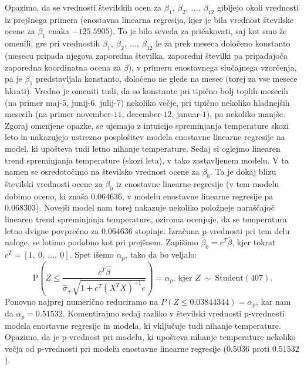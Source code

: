 \documentclass{article}
\begin{document}
Opazimo, da se vrednosti številskih ocen za $\beta_1,~\beta_2,~\dots,~\beta_{12}$ gibljejo okoli vrednosti iz prejšnega primera (enostavna linearna regresija, kjer je bila vrednost številske ocene za $\beta_1$ enaka $-125.5905$). 
To je bilo seveda za pričakovati, saj kot smo že omenili, gre pri vrednostih $\beta_1,~\beta_2,~\dots,~\beta_{12}$ le za prek meseca določeno konstanto (mesecu pripada njegova zaporedna številka, zaporedni številki pa pripadajoča zaporedna koordinatna ocena za $\beta$), v primeru enostavnega slučajnega vzorčenja, pa je $\beta_1$ predstavljala konstanto, določeno ne glede na mesec (torej za vse mesece hkrati). 
Vredno je omeniti tudi, da so konstante pri tipično bolj toplih mesecih (na primer maj-$5$, junij-$6$, julij-$7$) nekoliko večje, pri tipično nekoliko hladnejših mesecih (na primer november-$11$, december-$12$, januar-$1$), pa nekoliko manjše.
Zgoraj omenjene opazke, se ujemajo z intuicijo spreminjanja temperature skozi leto in nakazujejo ustrezno posplošitev modela enostavne linearne regresije na model, ki upošteva tudi letno nihanje temperature. 
\newline
Sedaj si oglejmo linearen trend spreminjanja temperature (skozi leta), v tako zastavljenem modelu. V ta namen se osredotočimo na številsko vrednost ocene za $\beta_0$. Ta je dokaj blizu številski vrednosti ocene za $\beta_0$ iz enostavne linearne regresije (v tem modelu dobimo oceno, ki znaša $0.064636$, v modelu enostavne linearne regresije pa $0.068303$). 
Novejši model nam torej nakazuje nekoliko položneje naraščajoč linearen trend spreminjanja temperature, oziroma ocenjuje, da se temperatura letno dvigne povprečno za $0.064636$ stopinje.
\newline
\newline 
Izračuna p-vrednosti pri tem delu naloge, se lotimo podobno kot pri prejšnem. Zapišimo $\hat{\beta}_0 = c^T\hat{\beta}$, kjer tokrat $c^T = [1,~0,~\dots,~0]$.
Spet išemo $\alpha_p$, tako da bo veljalo:
$$
\text{P}\left(Z \leq \frac{c^T\hat{\beta}}{\hat{\sigma}_{+}\sqrt{1 + c^T(X^TX)^{-1}c}}\right) = \alpha_p,~\text{kjer }Z~\sim~\text{Student}(407). 
$$
Ponovno najprej numerično reduciramo na $P(Z \leq 0.03844344) = \alpha_p$, kar nam da $\alpha_p = 0.51532$.
\newline
Komentirajmo sedaj razliko v številski vrednosti p-vrednosti modela enostavne regresije in modela, ki vključuje tudi nihanje temperature. 
Opazimo, da je p-vrednost pri modelu, ki upošteva nihanje temperature nekoliko večja od p-vrednosti pri modelu enostavne linearne regresije ($0.5036$ proti $0.51532$). 
\end{document}
